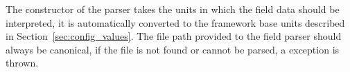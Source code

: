 The constructor of the parser takes the units in which the field data should be interpreted, it is automatically converted to the framework base units described in Section~\ref{sec:config_values}. The file path provided to the field parser should always be canonical, if the file is not found or cannot be parsed, a  exception is thrown.

\label{sec:tcad_electric_field_converter}

\label{sec:root_analysis_macros}
